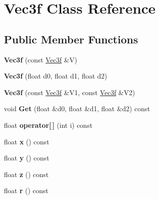 \hypertarget{classVec3f}{\section{\-Vec3f \-Class \-Reference}
\label{classVec3f}
}
\subsection*{\-Public \-Member \-Functions}
\begin{DoxyCompactItemize}
\item 
\hypertarget{classVec3f_abcc90a8786e61b9ae87d47f2c3c34acd}{{\bfseries \-Vec3f} (const \hyperlink{classVec3f}{\-Vec3f} \&\-V)}\label{classVec3f_abcc90a8786e61b9ae87d47f2c3c34acd}

\item 
\hypertarget{classVec3f_ad1b720bbc0088455823bfc2816789a2d}{{\bfseries \-Vec3f} (float d0, float d1, float d2)}\label{classVec3f_ad1b720bbc0088455823bfc2816789a2d}

\item 
\hypertarget{classVec3f_a5cddc92d35168ffaf9838fd661ab3d00}{{\bfseries \-Vec3f} (const \hyperlink{classVec3f}{\-Vec3f} \&\-V1, const \hyperlink{classVec3f}{\-Vec3f} \&\-V2)}\label{classVec3f_a5cddc92d35168ffaf9838fd661ab3d00}

\item 
\hypertarget{classVec3f_adc04e55fbdab76f77e2c6b2e3243a489}{void {\bfseries \-Get} (float \&d0, float \&d1, float \&d2) const }\label{classVec3f_adc04e55fbdab76f77e2c6b2e3243a489}

\item 
\hypertarget{classVec3f_a8e50e8a857f6587f04402b9447274e2f}{float {\bfseries operator\mbox{[}$\,$\mbox{]}} (int i) const }\label{classVec3f_a8e50e8a857f6587f04402b9447274e2f}

\item 
\hypertarget{classVec3f_a5c39b153bc4ba10503efbc98932c51d5}{float {\bfseries x} () const }\label{classVec3f_a5c39b153bc4ba10503efbc98932c51d5}

\item 
\hypertarget{classVec3f_a4d9122de39a48f6f18ba4184289b6cc0}{float {\bfseries y} () const }\label{classVec3f_a4d9122de39a48f6f18ba4184289b6cc0}

\item 
\hypertarget{classVec3f_a1e1ebbacd37cdd207a1d4b5dd9f2e80b}{float {\bfseries z} () const }\label{classVec3f_a1e1ebbacd37cdd207a1d4b5dd9f2e80b}

\item 
\hypertarget{classVec3f_aed70ad9eb39c47e2f90435de470d5779}{float {\bfseries r} () const }\label{classVec3f_aed70ad9eb39c47e2f90435de470d5779}


\end{DoxyCompactItemize}
